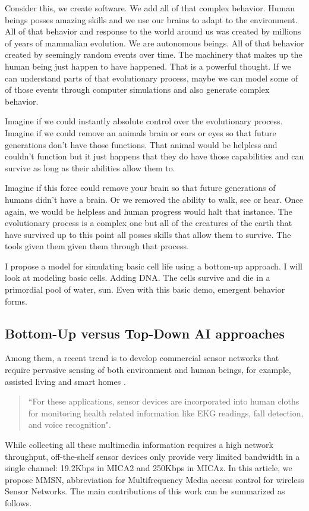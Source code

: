 Consider this, we create software.  We add all of that complex behavior.  Human
beings posses amazing skills and we use our brains to adapt to the environment. 
All of that behavior and response to the world around us was created by millions
of years of mammalian evolution.  We are autonomous beings.  All of that
behavior created by seemingly random events over time.   The machinery that
makes up the human being just happen to have happened.  That is a powerful
thought.  If we can understand parts of that evolutionary process, maybe we can
model some of of those events through computer simulations and also generate
complex behavior.

Imagine if we could instantly absolute control over the evolutionary process. 
Imagine if we could remove an animals brain or ears or eyes so that future
generations don't have those functions.  That animal would be helpless and
couldn't function but it just happens that they do have those capabilities and
can survive as long as their abilities allow them to.

Imagine if this force could remove your brain so that future generations of
humans didn't have a brain.  Or we removed the ability to walk, see or hear. 
Once again, we would be helpless and human progress would halt that instance.
The evolutionary process is a complex one but all of the creatures of the earth
that have survived up to this point all posses skills that allow them to
survive. The tools given them given them through that process.

I propose a model for simulating basic cell life using a bottom-up approach.  I
will look at modeling basic cells.  Adding DNA.  The cells survive and die in a
primordial pool of water, sun.  Even with this basic demo, emergent behavior
forms.

\subsection{Bottom-Up versus Top-Down AI approaches}



Among them, a recent trend is to develop
commercial sensor networks that require pervasive sensing of both
environment and human beings, for example, assisted living
\cite{Akyildiz-02,Harvard-01,CROSSBOW} and smart homes
\cite{Harvard-01,Adya-01,CROSSBOW}.

\begin{quote}
``For these applications, sensor devices are incorporated into human
cloths \cite{Natarajan-01,Zhou-06,Bahl-02,Adya-01} for monitoring
health related information like EKG readings, fall detection, and voice recognition".
\end{quote}
While collecting all these multimedia information
\cite{Akyildiz-02} requires a high network throughput, off-the-shelf
sensor devices only provide very limited bandwidth in a single
channel: 19.2Kbps in MICA2 \cite{Bahl-02} and 250Kbps in MICAz.
In this article, we propose MMSN, abbreviation for Multifrequency
Media access control for wireless Sensor Networks. The main
contributions of this work can be summarized as follows.
